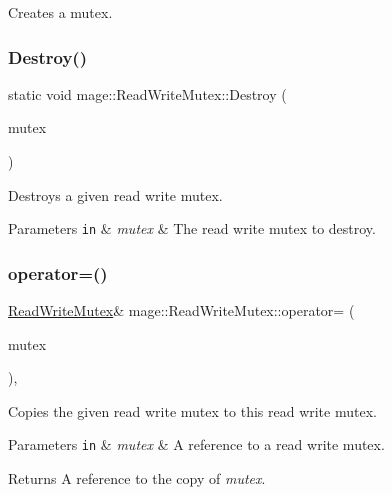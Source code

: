 Creates a mutex. \hypertarget{classmage_1_1_read_write_mutex_a879992fe8bf7fc81df9fa5ffa1c380a3}{}\label{classmage_1_1_read_write_mutex_a879992fe8bf7fc81df9fa5ffa1c380a3} 
\subsubsection{\texorpdfstring{Destroy()}{Destroy()}}
{\footnotesize\ttfamily static void mage\+::\+Read\+Write\+Mutex\+::\+Destroy (\begin{DoxyParamCaption}\item[{\hyperlink{classmage_1_1_read_write_mutex}{Read\+Write\+Mutex} $\ast$}]{mutex }\end{DoxyParamCaption})\hspace{0.3cm}{\ttfamily [static]}}

Destroys a given read write mutex.


\begin{DoxyParams}[1]{Parameters}
\mbox{\tt in}  & {\em mutex} & The read write mutex to destroy. \\
\hline
\end{DoxyParams}
\hypertarget{classmage_1_1_read_write_mutex_a408e06f3c8bcc644e43afbf7e9ac772f}{}\label{classmage_1_1_read_write_mutex_a408e06f3c8bcc644e43afbf7e9ac772f} 
\subsubsection{\texorpdfstring{operator=()}{operator=()}}
{\footnotesize\ttfamily \hyperlink{classmage_1_1_read_write_mutex}{Read\+Write\+Mutex}\& mage\+::\+Read\+Write\+Mutex\+::operator= (\begin{DoxyParamCaption}\item[{const \hyperlink{classmage_1_1_read_write_mutex}{Read\+Write\+Mutex} \&}]{mutex }\end{DoxyParamCaption})\hspace{0.3cm}{\ttfamily [private]}, {\ttfamily [delete]}}

Copies the given read write mutex to this read write mutex.


\begin{DoxyParams}[1]{Parameters}
\mbox{\tt in}  & {\em mutex} & A reference to a read write mutex. \\
\hline
\end{DoxyParams}
\begin{DoxyReturn}{Returns}
A reference to the copy of {\itshape mutex}. 
\end{DoxyReturn}
\hypertarget{classmage_1_1_read_write_mutex_a0af5059a9bd16abd8a21b15e7ebe053d}{}\label{classmage_1_1_read_write_mutex_a0af5059a9bd16abd8a21b15e7ebe053d} 
